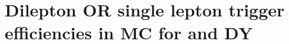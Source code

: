 \clearpage
\newpage

\section{Dilepton OR single lepton trigger efficiencies in MC for \ttbar and DY} \label{appSec:triggerSystPlots}

%
%
%
